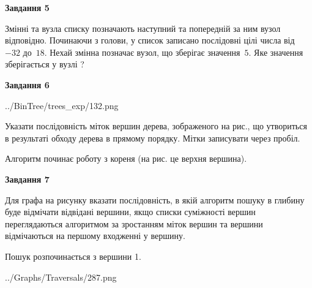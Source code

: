 \documentclass[12pt, ukrainian]{article}
\begin{document}
{\begin {large}
{\begin {center}\textbf{Завдання 5}\end {center}}\par
Змінні  та  вузла списку позначають наступний та попередній за ним вузол відповідно. Починаючи з голови, у список записано послідовні цілі числа від~$-32$ до~$18$. Нехай змінна  позначає вузол, що зберігає значення~$5$.
Яке значення зберігається у вузлі  ?\par
\newpage

{\begin {center}\textbf{Завдання 6}\end {center}}\par

\begin{center}
	{../BinTree/trees_exp/132.png}
\end{center}
Указати послідовність міток вершин дерева, зображеного на рис., що утвориться в результаті обходу дерева в прямому порядку. Мітки записувати через пробіл.\par Алгоритм починає роботу з кореня (на рис. це верхня вершина).\par
\newpage

{\begin {center}\textbf{Завдання 7}\end {center}}\par
Для графа на рисунку вказати послідовність, в якій алгоритм пошуку в глибину буде відмічати відвідані вершини, якщо списки суміжності вершин переглядаються алгоритмом за зростанням міток вершин та вершини відмічаються на першому вход\-женні у вершину.\par
Пошук розпочинається з вершини 1.\par

\begin{center}
	{../Graphs/Traversals/287.png}
\end{center}\par
\newpage


\end{large}}
\end{document}
